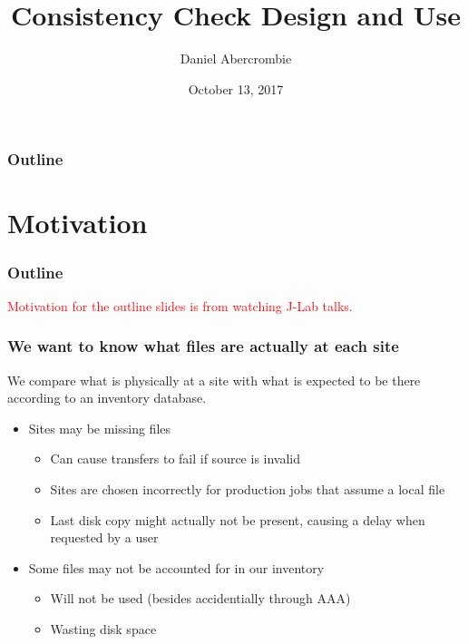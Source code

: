 \documentclass{beamer}
\author[D. Abercrombie]{
  Daniel Abercrombie
}
\title{\bf \sffamily Consistency Check Design and Use}
\date{October 13, 2017}
\begin{document}
\begin{frame}
  \titlepage
\end{frame}

\begin{frame}
  \frametitle{Outline}
  \tableofcontents
\end{frame}

\section{Motivation}

\begin{frame}
  \frametitle{Outline}
  \textcolor{red}{Motivation for the outline slides is from watching J-Lab talks.}
  \tableofcontents[currentsection]
\end{frame}

\begin{frame}
  \frametitle{We want to know what files are actually at each site}

  We compare what is physically at a site with what is
  expected to be there according to an inventory database.

  \begin{itemize}
  \item Sites may be missing files
    \begin{itemize}
    \item Can cause transfers to fail if source is invalid
    \item Sites are chosen incorrectly for production jobs
      that assume a local file
    \item Last disk copy might actually not be present,
      causing a delay when requested by a user
    \end{itemize}
  \item Some files may not be accounted for in our inventory
    \begin{itemize}
    \item Will not be used (besides accidentially through AAA)
    \item Wasting disk space
    \end{itemize}
  \end{itemize}

\end{frame}
\end{document}
